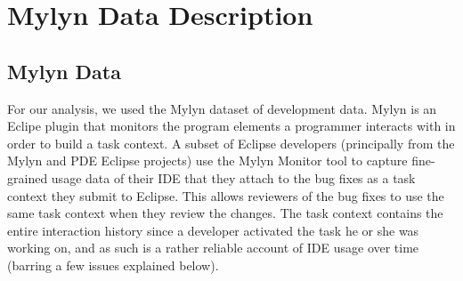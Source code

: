 \documentclass[times]{smrauth}
\begin{document}






\section{Mylyn Data Description}

\subsection{Mylyn Data}
For our analysis, we used the Mylyn dataset of development data.  Mylyn \cite{KM06} is an Eclipe plugin that monitors the program elements a programmer interacts with in order to build a task context. A subset of Eclipse developers (principally from the Mylyn and PDE Eclipse projects) use the Mylyn Monitor tool to capture fine-grained usage data of their IDE that they attach to the bug fixes as a task context they submit to Eclipse. This allows reviewers of the bug fixes to use the same task context when they review the changes. The task context contains the entire interaction history since a developer activated the task he or she was working on, and as such is a rather reliable account of IDE usage over time (barring a few issues explained below).
\end{document}
